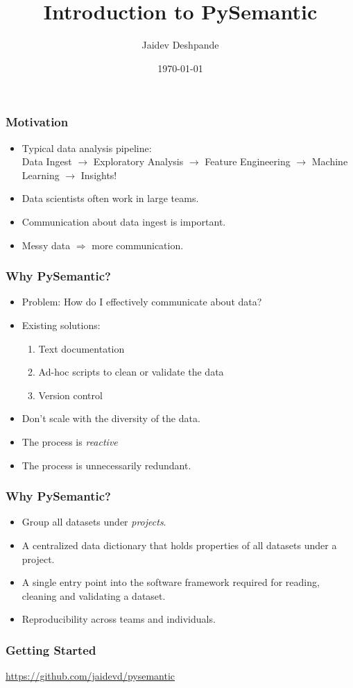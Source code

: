 \documentclass{beamer}
\title[Introduction to PySemantic]{Introduction to PySemantic}
\author{Jaidev Deshpande} %
\institute[Cube26 Pvt Limited] %
\date{\today} %
\begin{document}
\begin{frame}
\titlepage %
\end{frame}

\begin{frame}
\frametitle{Motivation}
\begin{itemize}
\item Typical data analysis pipeline:\\
Data Ingest $\rightarrow$ Exploratory Analysis $\rightarrow$ Feature Engineering $\rightarrow$ Machine Learning $\rightarrow$ Insights!
\item Data scientists often work in large teams.
\item Communication about data ingest is important.
\item Messy data $\Rightarrow$ more communication.
\end{itemize}
\end{frame}

\begin{frame}
    \frametitle{Why PySemantic?}
    \begin{itemize}
        \item Problem: How do I effectively communicate about data?
        \item Existing solutions:\\
            \begin{enumerate}
                \item Text documentation
                \item Ad-hoc scripts to clean or validate the data
                \item Version control
            \end{enumerate}
        \item Don't scale with the diversity of the data.
        \item The process is \textit{reactive}
        \item The process is unnecessarily redundant.
    \end{itemize}
\end{frame}

\begin{frame}
    \frametitle{Why PySemantic?}
    \begin{itemize}
        \item Group all datasets under \textit{projects}.
        \item A centralized data dictionary that holds properties of all
            datasets under a project.
        \item A single entry point into the software framework required for
            reading, cleaning and validating a dataset.
        \item Reproducibility across teams and individuals.
    \end{itemize}
\end{frame}

\begin{frame}
    \frametitle{Getting Started}
    \url{https://github.com/jaidevd/pysemantic}
\end{frame}


\end{document}
